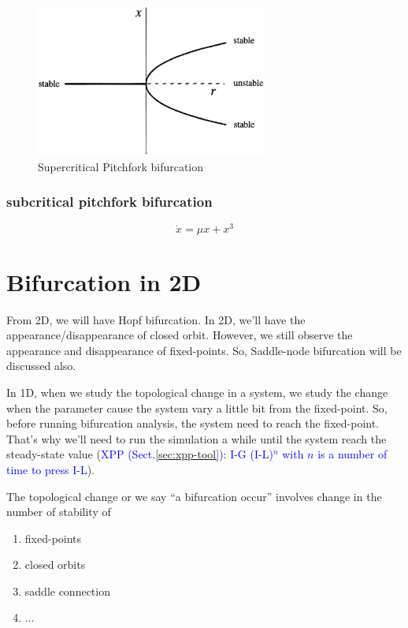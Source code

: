 \begin{figure}[hbt]
  \centerline{\includegraphics[height=5cm,
    angle=0]{./images/pitchfork_bifur.eps}}
\caption{Supercritical Pitchfork bifurcation}
\label{fig:pitchfork_bifur_super}
\end{figure}


\subsubsection{subcritical pitchfork bifurcation}
\label{sec:subcr-pitchf-bifurc}

\begin{equation}
  \label{eq:672}
  \dot{x} = \mu x + x^3
\end{equation}


\section{Bifurcation in 2D}
\label{sec:bifurcation-2d}

From 2D, we will have Hopf bifurcation. In 2D, we'll have the
appearance/disappearance of closed orbit. However, we still observe
the appearance and disappearance of fixed-points. So, Saddle-node
bifurcation will be discussed also. 

In 1D, when we study the topological change in a system, we study the
change when the parameter cause the system vary a little bit from the
fixed-point. So, before running bifurcation analysis, the system need
to reach the fixed-point. That's why we'll need to run the simulation
a while until the system reach the steady-state value
(\textcolor{blue}{XPP (Sect.\ref{sec:xpp-tool}): I-G (I-L)$^n$ with $n$ is a
number of time to press I-L}).

The topological change or we say ``a bifurcation occur'' involves
change in the number of stability of
\begin{enumerate}
\item fixed-points
\item closed orbits
\item saddle connection
\item ...
\end{enumerate}


